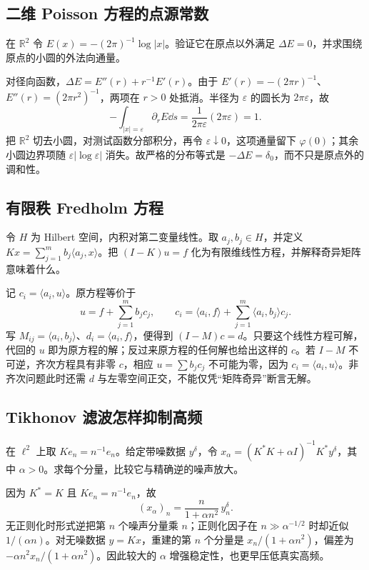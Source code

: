 \subsection*{二维 Poisson 方程的点源常数}
在 \(\mathbb R^2\) 令 \(E(x)=-(2\pi)^{-1}\log|x|\)。验证它在原点以外满足 \(\Delta E=0\)，并求围绕原点的小圆的外法向通量。

对径向函数，\(\Delta E=E''(r)+r^{-1}E'(r)\)。由于 \(E'(r)=-(2\pi r)^{-1}\)、\(E''(r)=(2\pi r^2)^{-1}\)，两项在 \(r>0\) 处抵消。半径为 \(\varepsilon\) 的圆长为 \(2\pi\varepsilon\)，故
\[
-\int_{|x|=\varepsilon}\partial_rE\dd s
=\frac1{2\pi\varepsilon}(2\pi\varepsilon)=1.
\]
把 \(\mathbb R^2\) 切去小圆，对测试函数分部积分，再令 \(\varepsilon\downarrow0\)，这项通量留下 \(\varphi(0)\)；其余小圆边界项随 \(\varepsilon|\log\varepsilon|\) 消失。故严格的分布等式是 \(-\Delta E=\delta_0\)，而不只是原点外的调和性。

\subsection*{有限秩 Fredholm 方程}
令 \(H\) 为 Hilbert 空间，内积对第二变量线性。取 \(a_j,b_j\in H\)，并定义 \(Kx=\sum_{j=1}^m b_j\langle a_j,x\rangle\)。把 \((I-K)u=f\) 化为有限维线性方程，并解释奇异矩阵意味着什么。

记 \(c_i=\langle a_i,u\rangle\)。原方程等价于
\[
u=f+\sum_{j=1}^m b_jc_j,\qquad
c_i=\langle a_i,f\rangle+\sum_{j=1}^m\langle a_i,b_j\rangle c_j.
\]
写 \(M_{ij}=\langle a_i,b_j\rangle\)、\(d_i=\langle a_i,f\rangle\)，便得到 \((I-M)c=d\)。只要这个线性方程可解，代回的 \(u\) 即为原方程的解；反过来原方程的任何解也给出这样的 \(c\)。若 \(I-M\) 不可逆，齐次方程具有非零 \(c\)，相应 \(u=\sum b_jc_j\) 不可能为零，因为 \(c_i=\langle a_i,u\rangle\)。非齐次问题此时还需 \(d\) 与左零空间正交，不能仅凭“矩阵奇异”断言无解。

\subsection*{Tikhonov 滤波怎样抑制高频}
在 \(\ell^2\) 上取 \(Ke_n=n^{-1}e_n\)。给定带噪数据 \(y^\delta\)，令 \(x_\alpha=(K^*K+\alpha I)^{-1}K^*y^\delta\)，其中 \(\alpha>0\)。求每个分量，比较它与精确逆的噪声放大。

因为 \(K^*=K\) 且 \(Ke_n=n^{-1}e_n\)，故
\[
(x_\alpha)_n=\frac{n}{1+\alpha n^2}\,y_n^\delta.
\]
无正则化时形式逆把第 \(n\) 个噪声分量乘 \(n\)；正则化因子在 \(n\gg\alpha^{-1/2}\) 时却近似 \(1/(\alpha n)\)。对无噪数据 \(y=Kx\)，重建的第 \(n\) 个分量是 \(x_n/(1+\alpha n^2)\)，偏差为 \(-\alpha n^2x_n/(1+\alpha n^2)\)。因此较大的 \(\alpha\) 增强稳定性，也更早压低真实高频。

